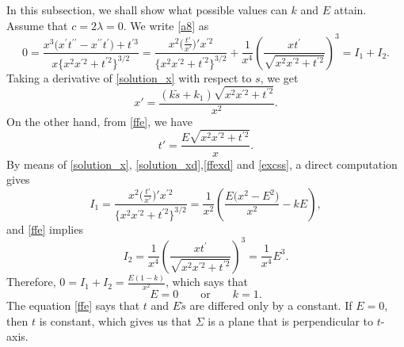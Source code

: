 \documentclass[10pt,a4paper]{amsart}
\numberwithin{equation}{section}
\begin{document}
In this subsection, we shall show what possible values can $k$ and $E$ attain.
Assume that $c=2\lambda=0$. We write \eqref{a8} as
\begin{equation*}%
0=\frac{x^{3}\bigl(x^{\prime }t^{\prime \prime }-x^{\prime \prime
}t^{\prime }\bigr)+t^{\prime 3}}{x\big\{x^2x^{\prime 2}+t^{\prime 2}\big\}^{3/2}}=\frac{x^{2}\bigl(\frac{t'}{x'}\bigr)'x^{\prime 2}}{\big\{x^2x^{\prime 2}+t^{\prime 2}\big\}^{3/2}}+\frac{1}{x^4}\left(\frac{xt^{\prime}}{\sqrt{x^{2}x^{\prime 2}+t^{\prime 2}}}\right)^3=I_1+I_2.
\end{equation*}
Taking a derivative of \eqref{solution_x} with respect to $s$, we get
\begin{equation}\label{solution_xd}
x'=\frac{(k\tilde{s}+k_{1})\sqrt{x^2x^{\prime 2}+t^{\prime 2}}}{x^2}.
\end{equation}
On the other hand, from \eqref{ffe}, we have
\begin{equation}\label{ffexd}
t'=\frac{E\sqrt{x^2x^{\prime 2}+t^{\prime 2}}}{x}.
\end{equation}
By means of \eqref{solution_x}, \eqref{solution_xd},\eqref{ffexd} and \eqref{excss}, a direct computation gives
\[
I_1=\frac{x^{2}\bigl(\frac{t'}{x'}\bigr)'x^{\prime 2}}{\big\{x^2x^{\prime 2}+t^{\prime 2}\big\}^{3/2}}=\frac{1}{x^2}\left(\frac{E\bigl(x^{2}-E^{2}\bigr)}{x^2}-kE\right),
\]
and \eqref{ffe} implies
\begin{equation*}
I_2=\frac{1}{x^4}\left(\frac{xt^{\prime}}{\sqrt{x^{2}x^{\prime 2}+t^{\prime 2}}}\right)^3=\frac{1}{x^{4}}E^3.
\end{equation*}
Therefore,
$0=I_1+I_2=\frac{E(1-k)}{x^2}$,
which says that
\begin{equation}\label{ekvl}
E=0\qquad \textrm{or}\qquad k=1.
\end{equation}
The equation \eqref{ffe} says that $t $ and $E\tilde s$ are differed only by a constant. If $E=0$, then $t$ is constant, which gives us that $\Sigma$ is a plane that is perpendicular to $t$-axis.
\end{document}
